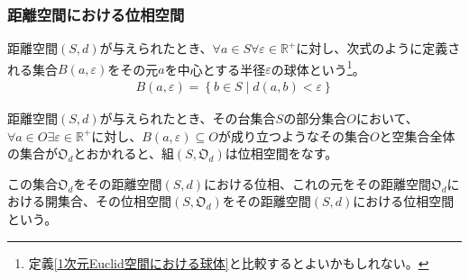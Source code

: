 \documentclass[dvipdfmx]{jsarticle}
\begin{document}
\subsubsection{距離空間における位相空間}%
\begin{dfn}
距離空間$(S,d)$が与えられたとき、$\forall a \in S\forall\varepsilon \in \mathbb{R}^{+}$に対し、次式のように定義される集合$B(a,\varepsilon)$をその元$a$を中心とする半径$\varepsilon$の球体という\footnote{定義\ref{1次元Euclid空間における球体}と比較するとよいかもしれない。}。
\begin{align*}
B(a,\varepsilon) = \left\{ b \in S \middle| d(a,b) < \varepsilon \right\}
\end{align*}
\end{dfn}
\begin{thm}\label{8.2.1.2}
距離空間$(S,d)$が与えられたとき、その台集合$S$の部分集合$O$において、$\forall a \in O\exists\varepsilon \in \mathbb{R}^{+}$に対し、$B(a,\varepsilon) \subseteq O$が成り立つようなその集合$O$と空集合全体の集合が$\mathfrak{O}_{d}$とおかれると、組$\left( S,\mathfrak{O}_{d} \right)$は位相空間をなす。
\end{thm}
\begin{dfn}
この集合$\mathfrak{O}_{d}$をその距離空間$(S,d)$における位相、これの元をその距離空間$\mathfrak{O}_{d}$における開集合、その位相空間$\left( S,\mathfrak{O}_{d} \right)$をその距離空間$(S,d)$における位相空間という。
\end{dfn}
\end{document}
